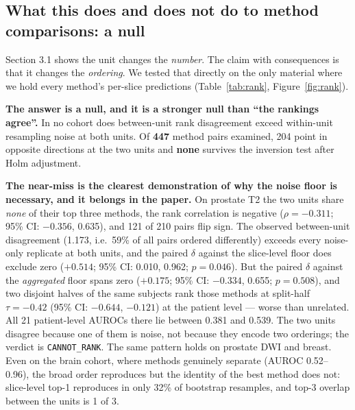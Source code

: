 \documentclass[11pt,a4paper]{article}
\begin{document}
\subsection{What this does and does not do to method comparisons: a null}

Section 3.1 shows the unit changes the \emph{number}. The claim with consequences
is that it changes the \emph{ordering}. We tested that directly on the only
material where we hold every method's per-slice predictions
(Table~\ref{tab:rank}, Figure~\ref{fig:rank}).

\textbf{The answer is a null, and it is a stronger null than ``the rankings
agree''.} In no cohort does between-unit rank disagreement exceed within-unit
resampling noise at both units. Of \textbf{447} method pairs examined, 204 point
in opposite directions at the two units and \textbf{none} survives the inversion
test after Holm adjustment.

\textbf{The near-miss is the clearest demonstration of why the noise floor is
necessary, and it belongs in the paper.} On prostate T2 the two units share
\emph{none} of their top three methods, the rank correlation is negative
($\rho=-0.311$; 95\% CI: $-0.356$, 0.635), and 121 of 210 pairs flip sign. The
observed between-unit disagreement (1.173, i.e.\ 59\% of all pairs ordered
differently) exceeds every noise-only replicate at both units, and the paired
$\delta$ against the slice-level floor does exclude zero ($+0.514$; 95\% CI:
0.010, 0.962; $p=0.046$). But the paired $\delta$ against the \emph{aggregated}
floor spans zero ($+0.175$; 95\% CI: $-0.334$, 0.655; $p=0.508$), and two
disjoint halves of the same subjects rank those methods at split-half
$\tau=-0.42$ (95\% CI: $-0.644$, $-0.121$) at the patient level --- worse than
unrelated. All 21 patient-level AUROCs there lie between 0.381 and 0.539. The
two units disagree because one of them is noise, not because they encode two
orderings; the verdict is \texttt{CANNOT\_RANK}. The same pattern holds on
prostate DWI and breast. Even on the brain cohort, where methods genuinely
separate (AUROC 0.52--0.96), the broad order reproduces but the identity of the
best method does not: slice-level top-1 reproduces in only 32\% of bootstrap
resamples, and top-3 overlap between the units is 1 of 3.
\end{document}

